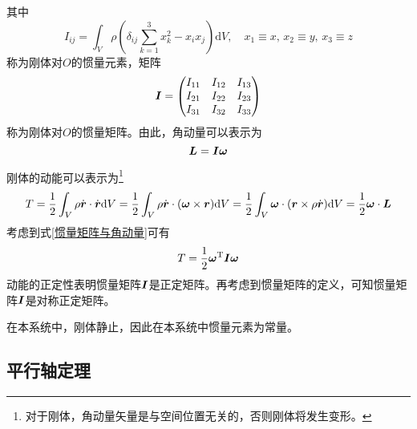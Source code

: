 其中
\begin{equation}
	I_{ij} = \int_V \rho \left(\delta_{ij}\sum_{k=1}^3 x_k^2-x_ix_j\right) \mathrm{d}V,\quad x_1 \equiv x,\,x_2 \equiv y,\,x_3 \equiv z
	\label{chapter6:惯量元素的定义式}
\end{equation}
称为刚体对$O$的{\heiti 惯量元素}，矩阵
\begin{equation}
	\boldsymbol{I} = \begin{pmatrix} I_{11} & I_{12} & I_{13} \\ I_{21} & I_{22} & I_{23} \\ I_{31} & I_{32} & I_{33} \end{pmatrix}
\end{equation}
称为刚体对$O$的{\heiti 惯量矩阵}。由此，角动量可以表示为
\begin{equation}
	\boldsymbol{L} = \boldsymbol{I} \boldsymbol{\omega}
	\label{惯量矩阵与角动量}
\end{equation}

刚体的动能可以表示为\footnote{对于刚体，角动量矢量是与空间位置无关的，否则刚体将发生变形。}
\begin{equation*}
	T = \frac12 \int_V \rho \dot{\boldsymbol{r}} \cdot \dot{\boldsymbol{r}} \mathrm{d} V = \frac12 \int_V \rho \dot{\boldsymbol{r}} \cdot (\boldsymbol{\omega} \times \boldsymbol{r}) \mathrm{d} V = \frac12 \int_V \boldsymbol{\omega} \cdot (\boldsymbol{r} \times \rho \dot{\boldsymbol{r}}) \mathrm{d} V = \frac12 \boldsymbol{\omega} \cdot \boldsymbol{L}
\end{equation*}
考虑到式\eqref{惯量矩阵与角动量}可有
\begin{equation}
	T = \frac12 \boldsymbol{\omega}^{\mathrm{T}} \boldsymbol{I} \boldsymbol{\omega}
\end{equation}
动能的正定性表明惯量矩阵$\boldsymbol{I}$是正定矩阵。再考虑到惯量矩阵的定义，可知惯量矩阵$\boldsymbol{I}$是对称正定矩阵。

在本系统中，刚体静止，因此在本系统中惯量元素为常量。

\subsection{平行轴定理}

